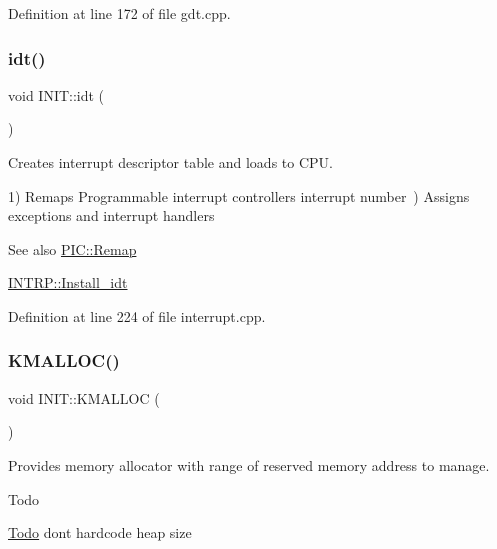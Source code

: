 Definition at line 172 of file gdt.\+cpp.

\mbox{\label{namespace_i_n_i_t_aec8e9f01cb09653075b6e610096b3ca9}} 
\subsubsection{\texorpdfstring{idt()}{idt()}}
{\footnotesize\ttfamily void I\+N\+I\+T\+::idt (\begin{DoxyParamCaption}{ }\end{DoxyParamCaption})}



Creates interrupt descriptor table and loads to C\+PU. 

1) Remaps Programmable interrupt controller\textquotesingle{}s interrupt number~) Assigns exceptions and interrupt handlers \begin{DoxySeeAlso}{See also}
\hyperlink{namespace_p_i_c_a2a04fe95329faacc43f00ad30fe554b9}{P\+I\+C\+::\+Remap} 

\hyperlink{namespace_i_n_t_r_p_a139b273cc1e45d3c2fdfe0d387a98518}{I\+N\+T\+R\+P\+::\+Install\+\_\+idt} 
\end{DoxySeeAlso}


Definition at line 224 of file interrupt.\+cpp.

\mbox{\label{namespace_i_n_i_t_ac811302ce0948a6a097b445b811f9c14}} 
\subsubsection{\texorpdfstring{K\+M\+A\+L\+L\+O\+C()}{KMALLOC()}}
{\footnotesize\ttfamily void I\+N\+I\+T\+::\+K\+M\+A\+L\+L\+OC (\begin{DoxyParamCaption}{ }\end{DoxyParamCaption})}



Provides memory allocator with range of reserved memory address to manage. 

\begin{DoxyRefDesc}{Todo}
\item[\hyperlink{todo__todo000002}{Todo}]don\textquotesingle{}t hardcode heap size \end{DoxyRefDesc}


